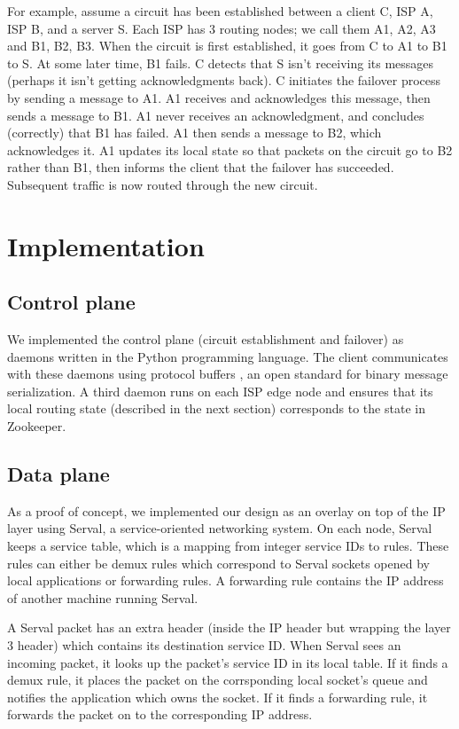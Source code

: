 \documentclass{article}
\begin{document}
For example, assume a circuit has been established between a client C,
ISP A, ISP B, and a server S. Each ISP has 3 routing nodes; we call
them A1, A2, A3 and B1, B2, B3. When the circuit is first established,
it goes from C to A1 to B1 to S. At some later time, B1 fails. C
detects that S isn't receiving its messages (perhaps it isn't getting
acknowledgments back). C initiates the failover process by sending a
message to A1. A1 receives and acknowledges this message, then sends a
message to B1. A1 never receives an acknowledgment, and concludes
(correctly) that B1 has failed. A1 then sends a message to B2, which
acknowledges it. A1 updates its local state so that packets on the
circuit go to B2 rather than B1, then informs the client that the
failover has succeeded. Subsequent traffic is now routed through the
new circuit.

\section{Implementation}
\subsection{Control plane}
We implemented the control plane (circuit establishment and failover)
as daemons written in the Python programming language. The client
communicates with these daemons using protocol buffers
\cite{protobuf}, an open standard for binary message serialization. A
third daemon runs on each ISP edge node and ensures that its local
routing state (described in the next section) corresponds to the state
in Zookeeper.
\subsection{Data plane}
As a proof of concept, we implemented our design as an overlay on top
of the IP layer using Serval, a service-oriented networking system. On
each node, Serval keeps a service table, which is a mapping from
integer service IDs to rules. These rules can either be demux rules
which correspond to Serval sockets opened by local applications or
forwarding rules. A forwarding rule contains the IP address of another
machine running Serval.

A Serval packet has an extra header (inside the IP header but wrapping
the layer 3 header) which contains its destination service ID. When
Serval sees an incoming packet, it looks up the packet's service ID in
its local table. If it finds a demux rule, it places the packet on
the corrsponding local socket's queue and notifies the application
which owns the socket. If it finds a forwarding rule, it forwards the
packet on to the corresponding IP address.
\end{document}
